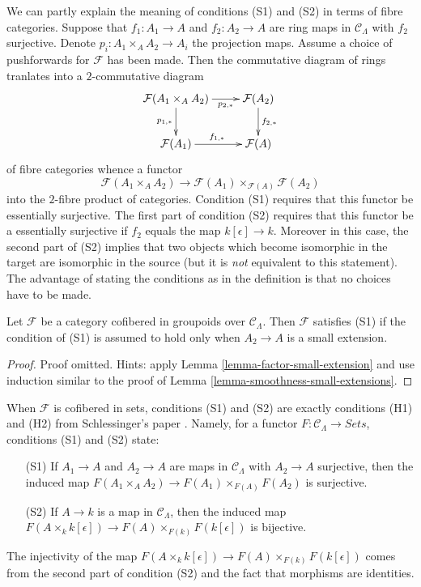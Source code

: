 \noindent
We can partly explain the meaning of conditions (S1) and (S2) in terms of
fibre categories. Suppose that $f_1 : A_1 \to A$ and $f_2 : A_2 \to A$ are
ring maps in $\mathcal{C}_\Lambda$ with $f_2$ surjective.
Denote $p_i : A_1 \times_A A_2 \to A_i$ the projection maps.
Assume a choice of pushforwards for $\mathcal{F}$ has been made.
Then the commutative diagram of rings tranlates into a $2$-commutative diagram
$$
\xymatrix{
\mathcal{F}(A_1 \times_A A_2) \ar[r]_-{p_{2, *}} \ar[d]_{p_{1, *}} &
\mathcal{F}(A_2) \ar[d]^{f_{2, *}} \\
\mathcal{F}(A_1) \ar[r]^{f_{1, *}} & \mathcal{F}(A)
}
$$
of fibre categories whence a functor
\begin{equation}
\label{equation-compare}
\mathcal{F}(A_1 \times_A A_2) \to
\mathcal{F}(A_1) \times_{\mathcal{F}(A)} \mathcal{F}(A_2)
\end{equation}
into the $2$-fibre product of categories.
Condition (S1) requires that this functor be essentially surjective.
The first part of condition (S2) requires that this functor be a
essentially surjective if $f_2$ equals the map $k[\epsilon] \to k$.
Moreover in this case, the second part of (S2) implies that two objects
which become isomorphic in the target are isomorphic in the source
(but it is {\it not} equivalent to this statement).
The advantage of stating the conditions as in the definition
is that no choices have to be made.

\begin{lemma}
\label{lemma-S1-small-extensions}
Let $\mathcal{F}$ be a category cofibered in groupoids over $\mathcal 
C_\Lambda$. Then $\mathcal{F}$ satisfies (S1) if the condition of (S1)
is assumed to hold only when $A_2 \to A$ is a small extension.
\end{lemma}

\begin{proof}
Proof omitted. Hints: apply Lemma \ref{lemma-factor-small-extension}
and use induction similar to the proof of
Lemma \ref{lemma-smoothness-small-extensions}.
\end{proof}

\begin{remark}
\label{remark-compare-S1-S2-schlessinger}
When $\mathcal{F}$ is cofibered in sets, conditions (S1) and (S2) are exactly 
conditions (H1) and (H2) from Schlessinger's paper \cite{Sch}.
Namely, for a functor $F: \mathcal{C}_\Lambda \to 
\textit{Sets}$, conditions (S1) and (S2) state:
\begin{enumerate}
\item [(S1)] If $A_1 \to A$ and $A_2 \to A$ are maps in 
$\mathcal{C}_\Lambda$ with $A_2 \to A$ surjective, then the induced 
map $F(A_1 \times_{A} A_2) \to F(A_1) \times_{F(A)} F(A_2)$ is 
surjective.
\item [(S2)]  If $A \to k$ is a map in $\mathcal{C}_\Lambda$, then the 
induced map
$F(A \times_{k} k[\epsilon]) \to F(A) \times_{F(k)} F(k[\epsilon])$
is bijective.
\end{enumerate}
The injectivity of the map
$F(A \times_{k} k[\epsilon]) \to F(A) \times_{F(k)} F(k[\epsilon])$
comes from the second part of condition (S2) and the fact that morphisms
are identities.
\end{remark}


